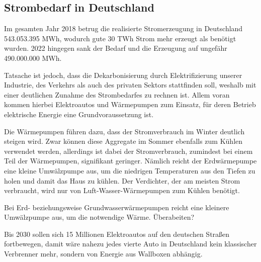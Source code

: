 \documentclass[12pt, a4paper]{article}
\begin{document}
\subsection{Strombedarf in Deutschland}
\label{subsec:energy_need}

Im gesamten Jahr 2018 betrug die realisierte Stromerzeugung in Deutschland 543.053.395 MWh, wodurch gute 30 TWh Strom mehr erzeugt als benötigt wurden. 2022 hingegen sank der Bedarf und die Erzeugung auf ungefähr 490.000.000 MWh.


Tatsache ist jedoch, dass die Dekarbonisierung durch Elektrifizierung unserer Industrie, des Verkehrs als auch des privaten Sektors stattfinden soll, weshalb mit einer deutlichen Zunahme des Strombedarfes zu rechnen ist. Allem voran kommen hierbei Elektroautos und Wärmepumpen zum Einsatz, für deren Betrieb elektrische Energie eine Grundvoraussetzung ist. 

Die Wärmepumpen führen dazu, dass der Stromverbrauch im Winter deutlich steigen wird. Zwar können diese Aggregate im Sommer ebenfalls zum Kühlen verwendet werden, allerdings ist dabei der Stromverbrauch, zumindest bei einem Teil der Wärmepumpen, signifikant geringer. Nämlich reicht der Erdwärmepumpe eine kleine Umwälzpumpe aus, um die niedrigen Temperaturen aus den Tiefen zu holen und damit das Haus zu kühlen. Der Verdichter, der am meisten Strom verbraucht, wird nur von Luft-Wasser-Wärmepumpen zum Kühlen benötigt.

Bei Erd- beziehungsweise Grundwasserwärmepumpen reicht eine kleinere Umwälzpumpe aus, um die notwendige Wärme. Überabeiten? 


Bis 2030 sollen sich 15 Millionen Elektroautos auf den deutschen Straßen fortbewegen, damit wäre nahezu jedes vierte Auto in Deutschland kein klassischer Verbrenner mehr, sondern von Energie aus Wallboxen abhängig.

\end{document}
